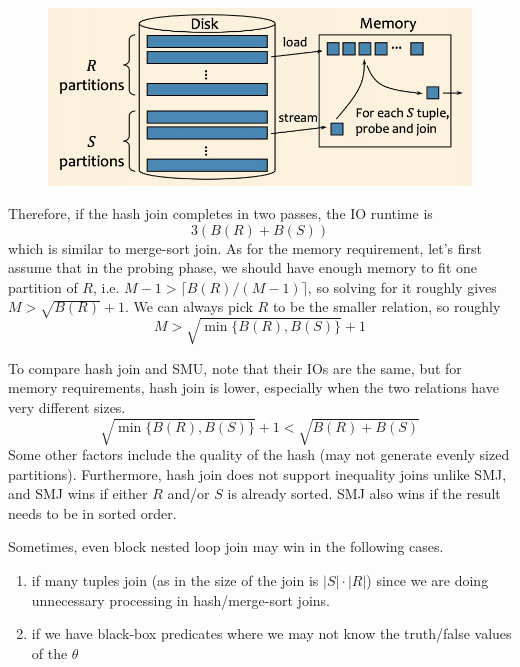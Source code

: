 \documentclass{article}
\begin{document}
\begin{definition}
      \begin{figure}[H]
        \centering 
        \includegraphics[scale=0.4]{img/hash_join2.png}
        \caption{} 
        \label{fig:hash_join2}
      \end{figure}

      Therefore, if the hash join completes in two passes, the IO runtime is 
      \begin{equation}
        3 ( B(R) + B(S)) 
      \end{equation}
      which is similar to merge-sort join. As for the memory requirement, let's first assume that in the probing phase, we should have enough memory to fit one partition of $R$, i.e. $M-1 > \lceil B(R) / (M-1) \rceil$, so solving for it roughly gives $M > \sqrt{B(R)} + 1$. We can always pick $R$ to be the smaller relation, so roughly 
      \begin{equation}
        M > \sqrt{\min\{ B(R), B(S)\}} + 1
      \end{equation}
    \end{definition}

    To compare hash join and SMU, note that their IOs are the same, but for memory requirements, hash join is lower, especially when the two relations have very different sizes. 
    \begin{equation}
      \sqrt{\min\{B(R), B(S)\}} + 1 < \sqrt{B(R) + B(S)}
    \end{equation}
    Some other factors include the quality of the hash (may not generate evenly sized partitions). Furthermore, hash join does not support inequality joins unlike SMJ, and SMJ wins if either $R$ and/or $S$ is already sorted. SMJ also wins if the result needs to be in sorted order. 

    Sometimes, even block nested loop join may win in the following cases. 
    \begin{enumerate}
      \item if many tuples join (as in the size of the join is $|S| \cdot |R|$) since we are doing unnecessary processing in hash/merge-sort joins. 
      \item if we have black-box predicates where we may not know the truth/false values of the $\theta$
    \end{enumerate}
 
\end{document}
